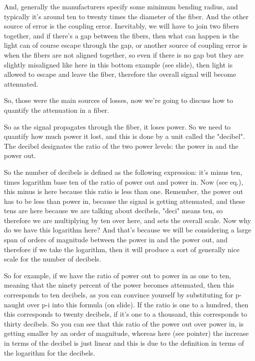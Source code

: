 And, generally the manufacturers specify some minimum bending radius, and typically it's around ten to twenty times the diameter of the fiber. And the other source of error is the coupling error. Inevitably, we will have to join two fibers together, and if there's a gap between the fibers, then what can happen is the light can of course escape through the gap, or another source of coupling error is when the fibers are not aligned together, so even if there is no gap but they are slightly misaligned like here in this bottom example (see slide), then light is allowed to escape and leave the fiber, therefore the overall signal will become attenuated.

So, those were the main sources of losses, now we're going to discuss how to quantify the attenuation in a fiber.

So as the signal propagates through the fiber, it loses power. So we need to quantify how much power it lost, and this is done by a unit called the "decibel". The decibel designates the ratio of the two power levels: the power in and the power out.

So the number of decibels is defined as the following expression: it's minus ten, times logarithm base ten of the ratio of power out and power in. Now (see eq.), this minus is here because this ratio is less than one. Remember, the power out has to be less than power in, because the signal is getting attenuated, and these tens are here because we are talking about decibels, "deci" means ten, so therefore we are multiplying by ten over here, and sets the overall scale. Now why do we have this logarithm here? And that's because we will be considering a large span of orders of magnitude between the power in and the power out, and therefore if we take the logarithm, then it will produce a sort of generally nice scale for the number of decibels.

So for example, if we have the ratio of power out to power in as one to ten, meaning that the ninety percent of the power becomes attenuated, then this corresponds to ten decibels, as you can convince yourself by substituting for p-naught over p-i into this formula (on slide). If the ratio is one to a hundred, then this corresponds to twenty decibels, if it's one to a thousand, this corresponds to thirty decibels. So you can see that this ratio of the power out over power in, is getting smaller by an order of magnitude, whereas here (see pointer) the increase in terms of the decibel is just linear and this is due to the definition in terms of the logarithm for the decibels.

